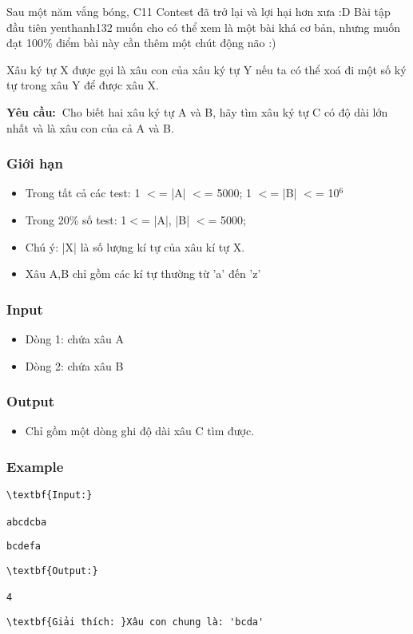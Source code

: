 

Sau một năm vắng bóng, C11 Contest đã trở lại và lợi hại hơn xưa :D Bài tập đầu tiên yenthanh132 muốn cho có thể xem là một bài khá cơ bản, nhưng muốn đạt 100\% điểm bài này cần thêm một chút động não :)

Xâu ký tự X được gọi là xâu con của xâu ký tự Y nếu ta có thể xoá đi một số ký tự trong xâu Y để được xâu X.

\textbf{Yêu cầu: }Cho biết hai xâu ký tự A và B, hãy tìm xâu ký tự C có độ dài lớn nhất và là xâu con của cả A và B.

\subsubsection{Giới hạn}
\begin{itemize}
	\item Trong tất cả các test: 1 $<$= |A| $<$= 5000; 1 $<$= |B| $<$= 10$^6$
	\item Trong 20\% số test: 1$<$= |A|, |B| $<$= 5000;
	\item Chú ý: |X| là số lượng kí tự của xâu kí tự X.
	\item Xâu A,B chỉ gồm các kí tự thường từ 'a' đến 'z'
\end{itemize}

\subsubsection{Input}
\begin{itemize}
	\item Dòng 1: chứa xâu A
	\item Dòng 2: chứa xâu B
\end{itemize}

\subsubsection{Output}
\begin{itemize}
	\item Chỉ gồm một dòng ghi độ dài xâu C tìm được.
\end{itemize}

\subsubsection{Example}
\begin{verbatim}
\textbf{Input:}

abcdcba\end{verbatim}
\begin{verbatim}
bcdefa\end{verbatim}
\begin{verbatim}
\textbf{Output:}

4\end{verbatim}
\begin{verbatim}
\textbf{Giải thích: }Xâu con chung là: 'bcda'\end{verbatim}
